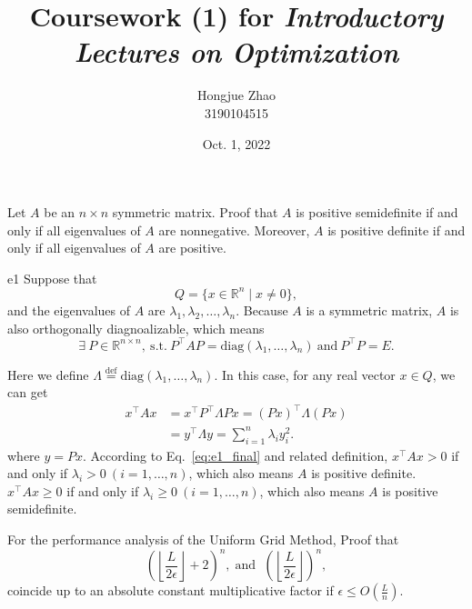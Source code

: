 \documentclass{article}
\title{Coursework (1) for \emph{Introductory Lectures on Optimization}}
\author{Hongjue Zhao \\ 3190104515}
\date{Oct. 1, 2022}
\begin{document}
\maketitle

\begin{excercise}\label{e1}
Let $A$ be an $n \times n$ symmetric matrix. Proof that $A$ is positive semidefinite if and only if all eigenvalues of $A$ are nonnegative. Moreover, $A$ is positive definite if and only if all eigenvalues of $A$ are positive.
\end{excercise}

\begin{PROOF}{e1} Suppose that
$$
Q = \{x \in \mathbb{R}^n \mid x \ne 0\},
$$
and the eigenvalues of $A$ are $\lambda_1, \lambda_2, \dots, \lambda_n$. Because $A$ is a symmetric matrix, $A$ is also orthogonally diagnoalizable, which means
\begin{equation}\label{eq:symmetric_diag}
    \exists~P \in \mathbb{R}^{n \times n},~\text{s.t.}~P^\top A P = \mathrm{diag}(\lambda_1, \dots, \lambda_n)~\text{and}~P^\top P = E.
\end{equation}

Here we define $\Lambda \overset{\text{def}}{=} \mathrm{diag}(\lambda_1, \dots, \lambda_n)$. In this case, for any real vector $x \in Q$, we can get
\begin{equation}\label{eq:e1_final}
\begin{aligned}
    x^\top A x &= x^\top P^\top \Lambda P x = (Px)^\top \Lambda (Px) \\
    &= y^\top \Lambda y = \sum_{i=1}^n \lambda_i y_i^2.
\end{aligned}
\end{equation}
where $y = Px$. According to Eq.~\ref{eq:e1_final} and related definition\cite{strang2006linear}, $x^\top A x > 0$ if and only if $\lambda_i > 0~(i=1, \dots,n)$, which also means $A$ is positive definite. $x^\top A x \ge 0$ if and only if $\lambda_i \ge 0~(i=1, \dots,n)$, which also means $A$ is positive semidefinite. 
\end{PROOF}

\begin{excercise}\label{e2}
	For the performance analysis of the Uniform Grid Method, Proof that
	\begin{equation}
		\left( \left \lfloor \frac{L}{2\epsilon} \right \rfloor + 2 \right)^n,\; \textrm{and } \; \left( \left \lfloor \frac{L}{2\epsilon} \right \rfloor \right)^n,\nonumber
	\end{equation}
	coincide up to an absolute constant multiplicative factor if $\epsilon \leq O(\frac{L}{n})$.
\end{excercise}
\end{document}

